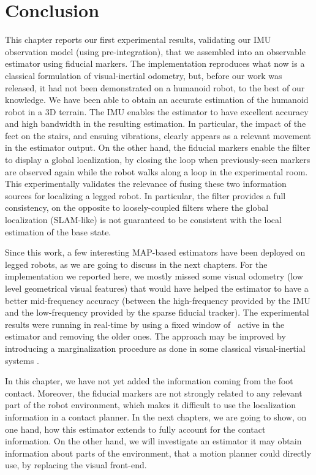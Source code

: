 \section{Conclusion}

This chapter reports our first experimental results, validating our IMU observation model (using pre-integration), that we assembled into an observable 
estimator using fiducial markers. The implementation reproduces what now is a classical formulation of visual-inertial odometry, but, before our work was released, 
it had not been demonstrated on a humanoid robot, to the best of our knowledge. We have been able to obtain an accurate estimation of the humanoid robot  in a 3D terrain.
The IMU enables the estimator to have excellent accuracy and high bandwidth in the resulting estimation. In particular, the impact of the feet on the stairs, 
and ensuing vibrations, clearly appears as a relevant movement in the estimator output. On the other hand, the fiducial markers enable the filter to display 
a global localization, by closing the loop when previously-seen markers are observed again while the 
robot walks along a loop in the experimental room. This experimentally validates the relevance of fusing these two information sources for localizing a legged robot. 
In particular, the filter provides a full consistency, on the opposite to loosely-coupled 
filters where the global localization (SLAM-like) is not guaranteed to be consistent with the local estimation of the base state. 

Since this work, a few interesting MAP-based estimators have been deployed on legged robots, as we are going to discuss in the next chapters. 
For the implementation we reported here, we mostly missed some visual odometry (\ie low level geometrical visual features) that would have helped the estimator 
to have a better mid-frequency accuracy (between the high-frequency provided by the IMU and the low-frequency provided by the sparse fiducial tracker).
The experimental results were running in real-time by using a fixed window of \keyframes\ active in the estimator and removing the older ones. The
approach may be improved by introducing a marginalization procedure as done in some classical visual-inertial systems \cite{leutenegger2015keyframe}.

In this chapter, we have not yet added the information coming from the foot contact. Moreover, the fiducial markers are not strongly related to any 
relevant part of the robot environment, which makes it difficult to use the localization information in a contact planner. In the next chapters, we are going to show, on one hand,
how this estimator extends to fully account for the contact information. On the other hand, we will investigate an estimator it may obtain information about parts of the environment, 
that a motion planner could directly use, by replacing the visual front-end.